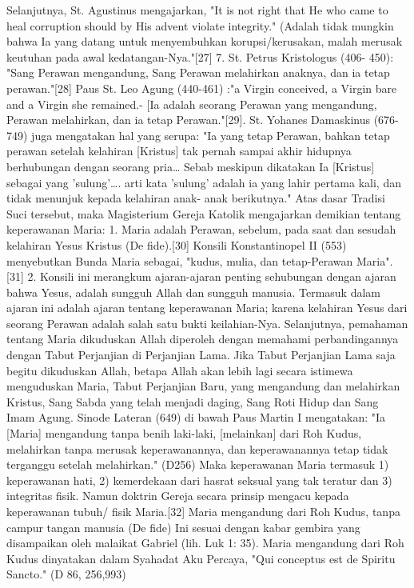 Selanjutnya, St. Agustinus mengajarkan, "It is not right that He who came to heal corruption should by His advent violate integrity." (Adalah tidak mungkin bahwa Ia yang datang untuk menyembuhkan korupsi/kerusakan, malah merusak keutuhan pada awal kedatangan-Nya."[27]
7.    St. Petrus Kristologus (406- 450): "Sang Perawan mengandung, Sang Perawan melahirkan anaknya, dan ia tetap perawan."[28] Paus St. Leo Agung (440-461) :"a Virgin conceived, a Virgin bare and a Virgin she remained.- [Ia adalah seorang Perawan yang mengandung, Perawan melahirkan, dan ia tetap Perawan."[29].  St. Yohanes Damaskinus (676- 749) juga mengatakan hal yang serupa: "Ia yang tetap Perawan, bahkan tetap perawan setelah kelahiran [Kristus] tak pernah sampai akhir hidupnya berhubungan dengan seorang pria… Sebab meskipun dikatakan Ia [Kristus] sebagai yang ’sulung’…. arti kata ’sulung’ adalah ia yang lahir pertama kali, dan tidak menunjuk kepada kelahiran anak- anak berikutnya."
Atas dasar Tradisi Suci tersebut, maka Magisterium Gereja Katolik mengajarkan demikian tentang keperawanan Maria:
1. Maria adalah Perawan, sebelum, pada saat dan sesudah kelahiran Yesus Kristus (De fide).[30]
Konsili Konstantinopel II (553) menyebutkan Bunda Maria sebagai, "kudus, mulia, dan tetap-Perawan Maria".[31]
2. Konsili ini merangkum ajaran-ajaran penting sehubungan dengan ajaran bahwa Yesus, adalah sungguh Allah dan sungguh manusia. Termasuk dalam ajaran ini adalah ajaran tentang keperawanan Maria; karena kelahiran Yesus dari seorang Perawan adalah salah satu bukti keilahian-Nya. Selanjutnya, pemahaman tentang Maria dikuduskan Allah diperoleh dengan memahami perbandingannya dengan Tabut Perjanjian di Perjanjian Lama. Jika Tabut Perjanjian Lama saja begitu dikuduskan Allah, betapa Allah akan lebih lagi secara istimewa menguduskan Maria, Tabut Perjanjian Baru, yang mengandung dan melahirkan Kristus, Sang Sabda yang telah menjadi daging, Sang Roti Hidup dan Sang Imam Agung. Sinode Lateran (649) di bawah Paus Martin I mengatakan:
"Ia [Maria] mengandung tanpa benih laki-laki, [melainkan] dari Roh Kudus, melahirkan tanpa merusak keperawanannya, dan keperawanannya tetap tidak terganggu setelah melahirkan." (D256)
Maka keperawanan Maria termasuk 1) keperawanan hati, 2) kemerdekaan dari hasrat seksual yang tak teratur dan 3) integritas fisik. Namun doktrin Gereja secara prinsip mengacu kepada keperawanan tubuh/ fisik Maria.[32]
Maria mengandung dari Roh Kudus, tanpa campur tangan manusia (De fide)
Ini sesuai dengan kabar gembira yang disampaikan oleh malaikat Gabriel (lih. Luk 1: 35). Maria mengandung dari Roh Kudus dinyatakan dalam Syahadat Aku Percaya, "Qui conceptus est de Spiritu Sancto." (D 86, 256,993)
